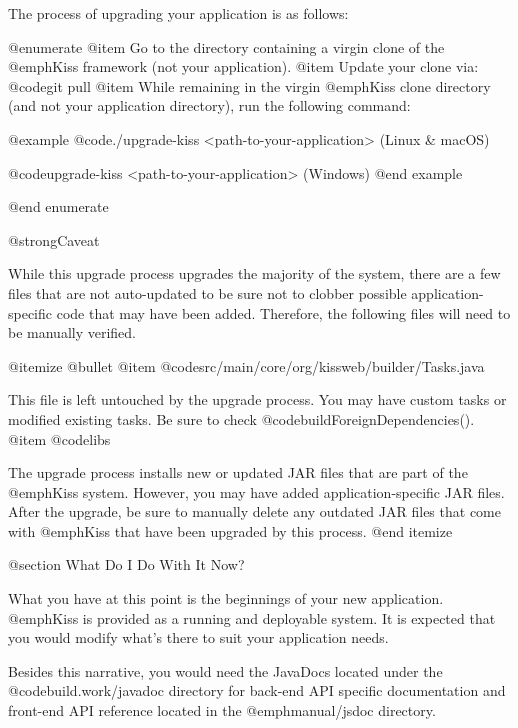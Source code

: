 The process of upgrading your application is as follows:

@enumerate
@item
Go to the directory containing a virgin clone of the @emph{Kiss} framework (not your application).
@item
Update your clone via: @code{git pull}
@item
While remaining in the virgin @emph{Kiss} clone directory (and not your application directory),
run the following command:  

@example
@code{./upgrade-kiss <path-to-your-application>} (Linux & macOS)

@code{upgrade-kiss <path-to-your-application>} (Windows)
@end example

@end enumerate

@strong{Caveat}

While this upgrade process upgrades the majority of the system, there
are a few files that are not auto-updated to be sure not to clobber
possible application-specific code that may have been added.
Therefore, the following files will need to be manually verified.

@itemize @bullet
@item
@code{src/main/core/org/kissweb/builder/Tasks.java}

This file is left untouched by the upgrade process.  You may have
custom tasks or modified existing tasks.  Be sure to check
@code{buildForeignDependencies()}.
@item
@code{libs}

The upgrade process installs new or updated JAR files that are part of
the @emph{Kiss} system.  However, you may have added
application-specific JAR files.  After the upgrade, be sure to manually delete any
outdated JAR files that come with @emph{Kiss} that have been upgraded
by this process.
@end itemize


@section What Do I Do With It Now?

What you have at this point is the beginnings of your new application.
@emph{Kiss} is provided as a running and deployable system.  It is
expected that you would modify what's there to suit your application
needs.

Besides this narrative, you would need the JavaDocs located under the
@code{build.work/javadoc} directory for back-end API specific documentation and
front-end API reference located in the @emph{manual/jsdoc} directory.
